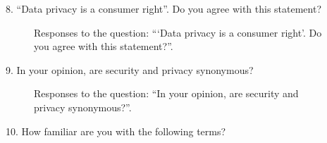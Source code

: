 \clearpage

8. ``Data privacy is a consumer right''. Do you agree with this statement?

\begin{figure}[H]
    \begin{center}
        \caption*{Responses to the question: ```Data privacy is a consumer right'. Do you agree with this statement?''.}
        \label{fig:survey_s1_q8}
    \end{center}
\end{figure}

\vspace{2cm}

9. In your opinion, are security and privacy synonymous?

\begin{figure}[H]
    \centering
    \caption*{Responses to the question: ``In your opinion, are security and privacy synonymous?''.}
    \label{fig:survey_s1_q9}
\end{figure}

\clearpage

10. How familiar are you with the following terms?

